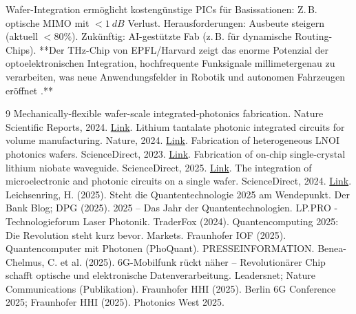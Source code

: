 	Wafer-Integration ermöglicht kostengünstige PICs für Basissationen: Z.\,B. optische MIMO mit $<\SI{1}{dB}$ Verlust. Herausforderungen: Ausbeute steigern (aktuell $<80\%$). Zukünftig: AI-gestützte Fab (z.\,B. für dynamische Routing-Chips). **Der THz-Chip von EPFL/Harvard zeigt das enorme Potenzial der optoelektronischen Integration, hochfrequente Funksignale millimetergenau zu verarbeiten, was neue Anwendungsfelder in Robotik und autonomen Fahrzeugen eröffnet \cite{thz_epfl}.**
	
	\begin{thebibliography}{9}
		 Mechanically-flexible wafer-scale integrated-photonics fabrication. Nature Scientific Reports, 2024. \href{https://www.nature.com/articles/s41598-024-61055-w}{Link}.
		 Lithium tantalate photonic integrated circuits for volume manufacturing. Nature, 2024. \href{https://www.nature.com/articles/s41586-024-07369-1}{Link}.
		 Fabrication of heterogeneous LNOI photonics wafers. ScienceDirect, 2023. \href{https://www.sciencedirect.com/science/article/abs/pii/S0169433223003422}{Link}.
		 Fabrication of on-chip single-crystal lithium niobate waveguide. ScienceDirect, 2025. \href{https://www.sciencedirect.com/science/article/abs/pii/S0030399224016062}{Link}.
		 The integration of microelectronic and photonic circuits on a single wafer. ScienceDirect, 2024. \href{https://www.sciencedirect.com/science/article/pii/S2589965124000540}{Link}.
		 Leichsenring, H. (2025). Steht die Quantentechnologie 2025 am Wendepunkt. Der Bank Blog; DPG (2025). 2025 – Das Jahr der Quantentechnologien. LP.PRO - Technologieforum Laser Photonik.
		 TraderFox (2024). Quantencomputing 2025: Die Revolution steht kurz bevor. Markets.
		 Fraunhofer IOF (2025). Quantencomputer mit Photonen (PhoQuant). PRESSEINFORMATION.
		 Benea-Chelmus, C. et al. (2025). 6G-Mobilfunk rückt näher – Revolutionärer Chip schafft optische und elektronische Datenverarbeitung. Leadersnet; Nature Communications (Publikation).
		 Fraunhofer HHI (2025). Berlin 6G Conference 2025; Fraunhofer HHI (2025). Photonics West 2025.
	\end{thebibliography}
	